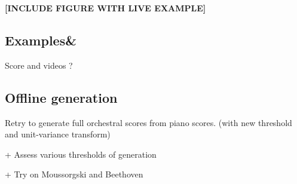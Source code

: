\documentclass[letterpaper]{article}
\begin{document}
\textbf{{[}INCLUDE FIGURE WITH LIVE EXAMPLE{]}}


\subsection{Examples\&}

Score and videos ?


\subsection{Offline generation}

Retry to generate full orchestral scores from piano scores. (with
new threshold and unit-variance transform) 

+ Assess various thresholds of generation

+ Try on Moussorgski and Beethoven
\end{document}
